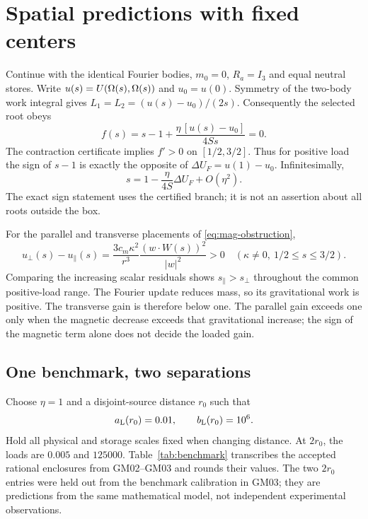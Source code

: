 \section{Spatial predictions with fixed centers}\label{sec:spatial}
Continue with the identical Fourier bodies, \(m_0=0\), \(R_a=I_3\) and equal neutral stores. Write \(u(s)=U(\Omega(s),\Omega(s))\) and \(u_0=u(0)\). Symmetry of the two-body work integral gives \(L_1=L_2=(u(s)-u_0)/(2s)\). Consequently the selected root obeys
\begin{equation}
 f(s)=s-1+\frac{\eta\,[u(s)-u_0]}{4Ss}=0.
 \label{eq:scalar}
\end{equation}
The contraction certificate implies \(f'>0\) on \([1/2,3/2]\). Thus for positive load the sign of \(s-1\) is exactly the opposite of
\(\Delta U_F=u(1)-u_0\). Infinitesimally,
\[
 s=1-\frac{\eta}{4S}\Delta U_F+O(\eta^2).
\]
The exact sign statement uses the certified branch; it is not an assertion about all roots outside the box.

For the parallel and transverse placements of \eqref{eq:mag-obstruction},
\begin{equation}
 u_\perp(s)-u_\parallel(s)
 =\frac{3c_m\kappa^2}{r^3}\frac{(w\cdot W(s))^2}{|w|^2}>0
 \quad(\kappa\ne0,\ 1/2\le s\le3/2).
 \label{eq:ordering}
\end{equation}
Comparing the increasing scalar residuals shows \(s_\parallel>s_\perp\) throughout the common positive-load range. The Fourier update reduces mass, so its gravitational work is positive. The transverse gain is therefore below one. The parallel gain exceeds one only when the magnetic decrease exceeds that gravitational increase; the sign of the magnetic term alone does not decide the loaded gain.

\subsection{One benchmark, two separations}
Choose \(\eta=1\) and a disjoint-source distance \(r_0\) such that
\[
 a_{\rm L}(r_0)=0.01,\qquad b_{\rm L}(r_0)=10^6.
\]
Hold all physical and storage scales fixed when changing distance. At \(2r_0\), the loads are \(0.005\) and \(125000\). Table~\ref{tab:benchmark} transcribes the accepted rational enclosures from GM02--GM03 and rounds their values. The two \(2r_0\) entries were held out from the benchmark calibration in GM03; they are predictions from the same mathematical model, not independent experimental observations.

